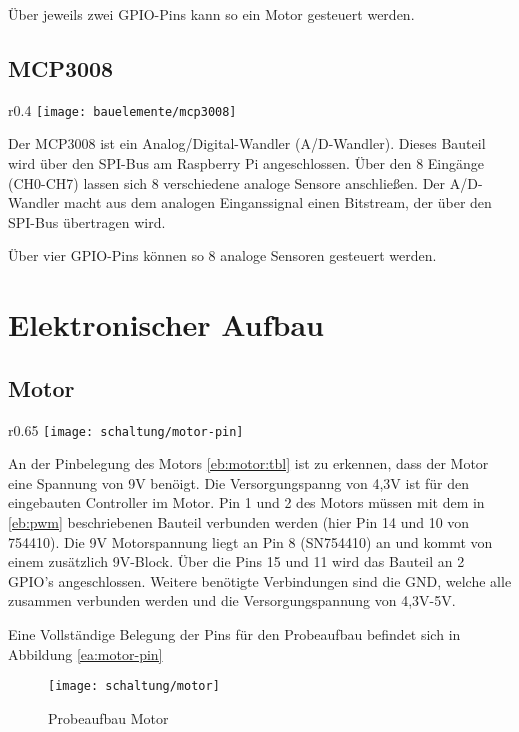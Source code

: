 Über jeweils zwei GPIO-Pins kann so ein Motor gesteuert werden.

\subsection{MCP3008}\label{eb:adwandler}
\begin{wrapfigure}{r}{0.4\textwidth}
\texttt{[image: bauelemente/mcp3008]}
\caption{MCP3008}
\label{eb:mcp3008}
\end{wrapfigure}
Der MCP3008 ist ein Analog/Digital-Wandler (A/D-Wandler). Dieses Bauteil wird über den SPI-Bus am Raspberry Pi angeschlossen. Über den 8 Eingänge (CH0-CH7) lassen sich 8 verschiedene analoge Sensore anschließen. Der A/D-Wandler macht aus dem analogen Einganssignal einen Bitstream, der über den SPI-Bus übertragen wird.

Über vier GPIO-Pins können so 8 analoge Sensoren gesteuert werden.

\section{Elektronischer Aufbau}

\subsection{Motor}
\begin{wrapfigure}{r}{0.65\textwidth}
\texttt{[image: schaltung/motor-pin]}
\caption{GPIO Belegung Motor}
\label{ea:motor-pin}
\end{wrapfigure}
An der Pinbelegung des Motors \ref{eb:motor:tbl} ist zu erkennen, dass der Motor eine Spannung von 9V benöigt. Die Versorgungspanng von 4,3V ist für den eingebauten Controller im Motor. Pin 1 und 2 des Motors müssen mit dem in \ref{eb:pwm} beschriebenen Bauteil verbunden werden (hier Pin 14 und 10 von 754410). Die 9V Motorspannung liegt an Pin 8 (SN754410) an und kommt von einem zusätzlich 9V-Block. Über die Pins 15 und 11 wird das Bauteil an 2 GPIO's angeschlossen. Weitere benötigte Verbindungen sind die GND, welche alle zusammen verbunden werden und die Versorgungspannung von 4,3V-5V.

Eine Vollständige Belegung der Pins für den Probeaufbau befindet sich in Abbildung \ref{ea:motor-pin}

\begin{figure}[h]
  \centering
  \texttt{[image: schaltung/motor]}
  \caption{Probeaufbau Motor}
  \label{schaltung:motor}
\end{figure}

